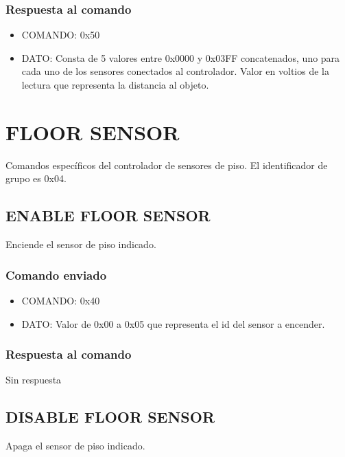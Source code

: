 \documentclass[a4paper,10pt]{article}
\begin{document}
\subsubsection*{Respuesta al comando}

\begin{itemize}
	\item{COMANDO:} 0x50
	\item{DATO:} Consta de 5 valores entre 0x0000 y 0x03FF concatenados, uno para cada uno de los sensores conectados al controlador.
	Valor en voltios de la lectura que representa la distancia al objeto.
\end{itemize}

\section{FLOOR SENSOR} 
\label{grupo_floor_sensor}

Comandos espec\'ificos del controlador de sensores de piso.
El identificador de grupo es 0x04.

\subsection{ENABLE FLOOR SENSOR}
\label{enable_fs}

Enciende el sensor de piso indicado.

\subsubsection*{Comando enviado}

\begin{itemize}
	\item{COMANDO:} 0x40
	\item{DATO:} Valor de 0x00 a 0x05 que representa el id del sensor a encender.
\end{itemize}

\subsubsection*{Respuesta al comando}

Sin respuesta

\subsection{DISABLE FLOOR SENSOR}
\label{disable_fs}

Apaga el sensor de piso indicado.
\end{document}
